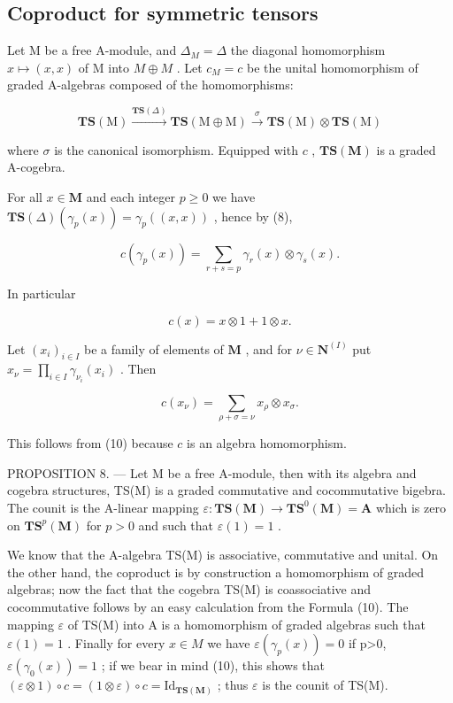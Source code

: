 \subsection{Coproduct for symmetric tensors}

Let M be a free A-module, and \(\Delta_{M} = \Delta\) the diagonal homomorphism \(x \mapsto (x, x)\) of M into \(M \oplus M\) . Let \(c_{M} = c\) be the unital homomorphism of graded A-algebras composed of the homomorphisms:

\[
\mathbf {T S} (\mathrm{M}) \xrightarrow {\mathbf {T S} (\Delta)} \mathbf {T S} (\mathrm{M} \oplus \mathrm{M}) \xrightarrow {\sigma} \mathbf {T S} (\mathrm{M}) \otimes \mathbf {T S} (\mathrm{M})
\]

where \(\sigma\) is the canonical isomorphism. Equipped with \(c\) , \(\mathbf{TS}(\mathbf{M})\) is a graded A-cogebra.

For all \(x \in \mathbf{M}\) and each integer \(p \geqslant 0\) we have \(\mathbf{TS}(\Delta) (\gamma_p(x)) = \gamma_p((x, x))\) , hence by (8),

\[
c \left(\gamma_ {p} (x)\right) = \sum_ {r + s = p} \gamma_ {r} (x) \otimes \gamma_ {s} (x).\tag{10}
\]

In particular

\[
c (x) = x \otimes 1 + 1 \otimes x.\tag{11}
\]

Let \((x_{i})_{i\in I}\) be a family of elements of \(\mathbf{M}\) , and for \(\nu \in \mathbf{N}^{(I)}\) put \(x_{\nu} = \prod_{i\in I}\gamma_{\nu_i}(x_i)\) . Then

\[
c \left(x _ {\nu}\right) = \sum_ {\rho + \sigma = \nu} x _ {\rho} \otimes x _ {\sigma}.\tag{12}
\]

This follows from (10) because \(c\) is an algebra homomorphism.

PROPOSITION 8. --- Let M be a free A-module, then with its algebra and cogebra structures, TS(M) is a graded commutative and cocommutative bigebra. The counit is the A-linear mapping \(\varepsilon: \mathbf{TS}(\mathbf{M}) \to \mathbf{TS}^0(\mathbf{M}) = \mathbf{A}\) which is zero on \(\mathbf{TS}^p(\mathbf{M})\) for \(p > 0\) and such that \(\varepsilon(1) = 1\) .

We know that the A-algebra TS(M) is associative, commutative and unital. On the other hand, the coproduct is by construction a homomorphism of graded algebras; now the fact that the cogebra TS(M) is coassociative and cocommutative follows by an easy calculation from the Formula (10). The mapping \(\varepsilon\) of TS(M) into A is a homomorphism of graded algebras such that \(\varepsilon(1)=1\) . Finally for every \(x\in M\) we have \(\varepsilon(\gamma_{p}(x))=0\) if p\textgreater0, \(\varepsilon(\gamma_{0}(x))=1\) ; if we bear in mind (10), this shows that \((\varepsilon\otimes1)\circ c=(1\otimes\varepsilon)\circ c=\mathrm{Id}_{\mathbf{TS}(\mathbf{M})}\) ; thus \(\varepsilon\) is the counit of TS(M).

